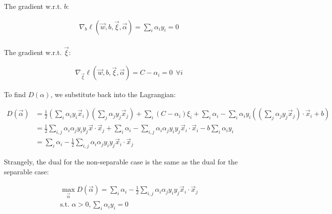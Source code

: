 \documentclass[fleqn]{homework}
\begin{document}
\begin{problem}{4}
    The gradient w.r.t. $b$:

    \begin{align*}
      \nabla_{b}\ell(\vec{w}, b, \vec{\xi}, \vec{\alpha}) 
      = \sum_i \alpha_i y_i = 0 \\
    \end{align*}

    The gradient w.r.t. $\vec{\xi}$:

    \begin{align*}
      \nabla_{\vec{\xi}}\ell(\vec{w}, b, \vec{\xi}, \vec{\alpha}) 
      = C - \alpha_i = 0 \:\: \forall i
    \end{align*}

    To find $D(\alpha)$, we substitute back into the Lagrangian:

    \begin{align*}
      D(\vec{\alpha}) 
      &= \frac{1}{2}\left(\sum_i \alpha_i y_i \vec{x}_i\right)\left(\sum_j \alpha_j y_j
        \vec{x}_j\right) + \sum_i (C-\alpha_i) \xi_i + \sum_i \alpha_i -
        \sum_i\alpha_iy_i\left(\left(\sum_j \alpha_j y_j
        \vec{x}_j\right)\cdot\vec{x}_i + b\right)\\
      &= \frac{1}{2}\sum_{i,j} \alpha_i \alpha_j y_i y_j \vec{x} \cdot \vec{x}_j + \sum_i \alpha_i -
        \sum_{i,j}\alpha_i \alpha_j y_i y_j \vec{x}_i \cdot \vec{x}_i - b\sum_i
        \alpha_i y_i\\
      &= \sum_i \alpha_i - \frac{1}{2}\sum_{i,j} \alpha_i \alpha_j y_i y_j \vec{x}_i \cdot \vec{x}_j
    \end{align*}

    Strangely, the dual for the non-separable case is the same as the dual for
    the separable case:

    \begin{align*}
      \max_{\vec{\alpha}} D(\vec{\alpha}) = \sum_i \alpha_i - \frac{1}{2}
      \sum_{i,j} \alpha_i \alpha_j y_i y_j \vec{x}_i \cdot \vec{x}_j \\
      \text{s.t. } \alpha > 0, \sum_i \alpha_i y_i = 0
    \end{align*}
  \end{problem}
\end{document}
